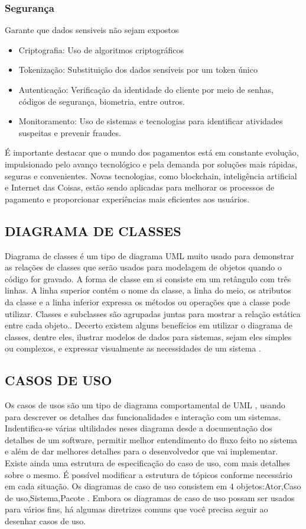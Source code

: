 \documentclass[a4paper,12pt]{article}
\begin{document}
\subsubsection{Segurança}
Garante que dados sensiveis não sejam expostos
\begin{itemize}
    \item Criptografia: Uso de algoritmos criptográficos
    \item Tokenização: Substituição dos dados sensíveis por um token único
    \item Autenticação: Verificação da identidade do cliente por meio de senhas, códigos de segurança, biometria, entre outros.
    \item Monitoramento: Uso de sistemas e tecnologias para identificar atividades suspeitas e prevenir fraudes.
\end{itemize}
É importante destacar que o mundo dos pagamentos está em constante evolução, impulsionado pelo avanço tecnológico e pela demanda por soluções mais rápidas, seguras e convenientes. Novas tecnologias, como blockchain, inteligência artificial e Internet das Coisas, estão sendo aplicadas para melhorar os processos de pagamento e proporcionar experiências mais eficientes aos usuários.
\newpage
\subsection{DIAGRAMA DE CLASSES}
Diagrama de classes é um tipo de diagrama \ac{UML} muito usado para demonstrar as relações de classes que serão usados para modelagem de objetos quando o código for gravado.
A forma de classe em si consiste em um retângulo
com três linhas. A linha superior contém o nome da classe,
a linha do meio, os atributos da classe e a linha inferior expressa os
métodos ou operações que a classe pode utilizar. Classes e subclasses
são agrupadas juntas para mostrar a relação estática entre cada objeto.\cite{diagramaclasse}.
Decerto existem alguns benefícios em utilizar o diagrama de classes, dentre eles, ilustrar
modelos de dados para sistemas, sejam eles simples ou complexos, e expressar visualmente as
necessidades de um sistema \cite{diagramaclasse}.
\subsection{CASOS DE USO}
Os casos de usos são um tipo de diagrama comportamental de \ac{UML} \cite{casodeusos}, usando para descrever os detalhes das funcionalidades e interação com um sistemas.
Indentifica-se várias ultilidades neses diagrama desde a documentação dos detalhes de um software, permitir melhor entendimento do fluxo feito no sistema e além de dar melhores detalhes para o desenvolvedor que vai implementar.
Existe ainda uma estrutura de especificação do caso de uso, com mais detalhes sobre
o mesmo. É possível modificar a estrutura de tópicos conforme necessário em cada situação.
Os diagramas de caso de uso consistem em 4 objetos:Ator,Caso de uso,Sistema,Pacote \cite{casodeusos}.
Embora os diagramas de caso de uso possam ser usados para vários fins, há algumas diretrizes comuns que você precisa seguir ao desenhar casos de uso.
\end{document}
